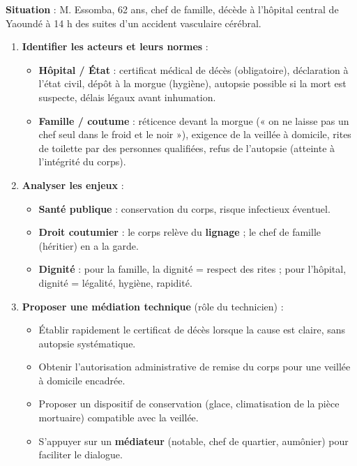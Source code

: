 \documentclass[11pt]{article}
\begin{document}
\begin{methode}
\textbf{Situation} : M. Essomba, 62 ans, chef de famille, décède à l'hôpital central de Yaoundé à 14 h des suites d'un accident vasculaire cérébral.
\begin{enumerate}
    \item \textbf{Identifier les acteurs et leurs normes} :
    \begin{itemize}
        \item \textbf{Hôpital / État} : certificat médical de décès (obligatoire), déclaration à l'état civil, dépôt à la morgue (hygiène), autopsie possible si la mort est suspecte, délais légaux avant inhumation.
        \item \textbf{Famille / coutume} : réticence devant la morgue (« on ne laisse pas un chef seul dans le froid et le noir »), exigence de la veillée à domicile, rites de toilette par des personnes qualifiées, refus de l'autopsie (atteinte à l'intégrité du corps).
    \end{itemize}
    \item \textbf{Analyser les enjeux} :
    \begin{itemize}
        \item \textbf{Santé publique} : conservation du corps, risque infectieux éventuel.
        \item \textbf{Droit coutumier} : le corps relève du \textbf{lignage} ; le chef de famille (héritier) en a la garde.
        \item \textbf{Dignité} : pour la famille, la dignité = respect des rites ; pour l'hôpital, dignité = légalité, hygiène, rapidité.
    \end{itemize}
    \item \textbf{Proposer une médiation technique} (rôle du technicien) :
    \begin{itemize}
        \item Établir rapidement le certificat de décès lorsque la cause est claire, sans autopsie systématique.
        \item Obtenir l'autorisation administrative de remise du corps pour une veillée à domicile encadrée.
        \item Proposer un dispositif de conservation (glace, climatisation de la pièce mortuaire) compatible avec la veillée.
        \item S'appuyer sur un \textbf{médiateur} (notable, chef de quartier, aumônier) pour faciliter le dialogue.
    \end{itemize}
\end{enumerate}
\end{methode}
\end{document}
